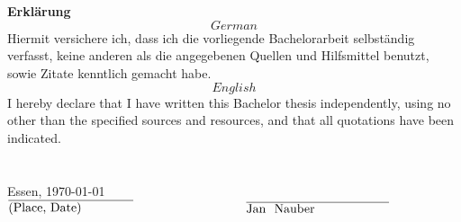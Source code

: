 
\ 

\cleardoublepage

\ 

\pagestyle{empty}
\vfill
\textbf{Erklärung}\\

\[German\] Hiermit versichere ich, dass ich die vorliegende Bachelorarbeit selbständig verfasst, keine anderen als die angegebenen Quellen und Hilfsmittel benutzt, sowie Zitate kenntlich gemacht habe.\\

\[English\] I hereby declare that I have written this Bachelor thesis independently, using no other than the specified sources and resources, and that all quotations have been indicated.\\
\\\\
Essen, \today\\
$\overline{\parbox{3.5cm}{(Place, Date)}} ~~~~~~~~~~~~~~~~~~~~~~~~~~~ \overline{\parbox{4cm}{\studentFirsName { } \studentSecondName}}$

